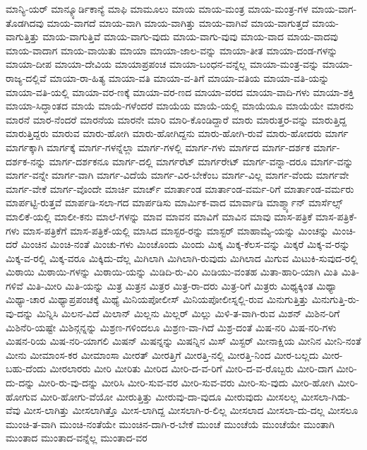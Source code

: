 {ಮಾನ್ಯಿ-ಯರ್
ಮಾನ್ಕ್ಯೂರ್ಡಿಕಾನ್ಯೆ
ಮಾಫಿ
ಮಾಮೂಲು
ಮಾಯ
ಮಾಯ-ಮಂತ್ರ
ಮಾಯ-ಮಂತ್ರ-ಗಳ
ಮಾಯ-ವಾಗ-ತೊಡಗಿದವು
ಮಾಯ-ವಾಗದೆ
ಮಾಯ-ವಾಗಿ
ಮಾಯ-ವಾಗಿತ್ತು
ಮಾಯ-ವಾಗಿವೆ
ಮಾಯ-ವಾಗುತ್ತದೆ
ಮಾಯ-ವಾಗುತ್ತಿತ್ತು
ಮಾಯ-ವಾಗುತ್ತಿವೆ
ಮಾಯ-ವಾಗು-ವುದು
ಮಾಯ-ವಾಗು-ವುವು
ಮಾಯ-ವಾದ
ಮಾಯ-ವಾದವು
ಮಾಯ-ವಾದಾಗ
ಮಾಯ-ವಾಯಿತು
ಮಾಯಾ
ಮಾಯಾ-ಜಾಲ-ವನ್ನು
ಮಾಯಾ-ತೀತ
ಮಾಯಾ-ದಂಡ-ಗಳನ್ನು
ಮಾಯಾ-ದೀಪ
ಮಾಯಾ-ದೇವಿಯ
ಮಾಯಾಪ್ರಪಂಚ
ಮಾಯಾ-ಬಂಧನ-ವನ್ನೆಲ್ಲ
ಮಾಯಾ-ಮಂತ್ರ-ವನ್ನು
ಮಾಯಾ-ರಾಜ್ಯ-ದಲ್ಲಿವೆ
ಮಾಯಾ-ರಾ-ಹಿತ್ಯ
ಮಾಯಾ-ವತಿ
ಮಾಯಾ-ವ-ತಿಗೆ
ಮಾಯಾ-ವತಿಯ
ಮಾಯಾ-ವತಿ-ಯನ್ನು
ಮಾಯಾ-ವತಿ-ಯಲ್ಲಿ
ಮಾಯಾ-ವರ-ಣಕ್ಕೆ
ಮಾಯಾ-ವರ-ಣದ
ಮಾಯಾ-ವರದ
ಮಾಯಾ-ವಾದಿ-ಗಳು
ಮಾಯಾ-ಶಕ್ತಿ
ಮಾಯಾ-ಸಿದ್ಧಾಂತದ
ಮಾಯೆ
ಮಾಯೆ-ಗಳೆಂದರೆ
ಮಾಯೆಯ
ಮಾಯೆ-ಯಲ್ಲಿ
ಮಾಯೆಯೂ
ಮಾಯೆಯೇ
ಮಾರನು
ಮಾರನೆ
ಮಾರ-ನೆಂದರೆ
ಮಾರನೆಯ
ಮಾರನೇ
ಮಾರಿ
ಮಾರಿ-ಕೊಂಡಿದ್ದಾರೆ
ಮಾರು
ಮಾರುತ್ತರ-ವನ್ನು
ಮಾರುತ್ತಿದ್ದ
ಮಾರುತ್ತಿದ್ದರು
ಮಾರುವ
ಮಾರು-ಹೋಗಿ
ಮಾರು-ಹೋಗಿದ್ದನು
ಮಾರು-ಹೋಗಿ-ರುವೆ
ಮಾರು-ಹೋದರು
ಮಾರ್ಗ
ಮಾರ್ಗಕ್ಕಾಗಿ
ಮಾರ್ಗಕ್ಕೆ
ಮಾರ್ಗ-ಗಳನ್ನೆಲ್ಲಾ
ಮಾರ್ಗ-ಗಳಲ್ಲಿ
ಮಾರ್ಗ-ಗಳು
ಮಾರ್ಗದ
ಮಾರ್ಗ-ದರ್ಶಕ
ಮಾರ್ಗ-ದರ್ಶಕ-ನನ್ನು
ಮಾರ್ಗ-ದರ್ಶಕನೂ
ಮಾರ್ಗ-ದಲ್ಲಿ
ಮಾರ್ಗರೆಟ್
ಮಾರ್ಗರೇಟ್
ಮಾರ್ಗ-ವನ್ನಾ-ದರೂ
ಮಾರ್ಗ-ವನ್ನು
ಮಾರ್ಗ-ವನ್ನೇ
ಮಾರ್ಗ-ವಾಗಿ
ಮಾರ್ಗ-ವಿದೆಯೆ
ಮಾರ್ಗ-ವಿರ-ಬೇಕೆಂಬ
ಮಾರ್ಗ-ವಿಲ್ಲ
ಮಾರ್ಗ-ವೆಂದು
ಮಾರ್ಗವೇ
ಮಾರ್ಗ-ವೇಕೆ
ಮಾರ್ಗ-ವೊಂದೇ
ಮಾರ್ಚಿ
ಮಾರ್ಚ್
ಮಾರ್ತಾಂಡ
ಮಾರ್ತಾಂಡ-ವರ್ಮ-ರಿಗೆ
ಮಾರ್ತಾಂಡ-ವರ್ಮರು
ಮಾರ್ಪಟ್ಟಿ-ರುತ್ತವೆ
ಮಾರ್ಪಡಿ-ಸಲಾ-ಗದ
ಮಾರ್ಪಡಿಸು
ಮಾರ್ಮಿಕ-ವಾದ
ಮಾರ್ವಾಡಿ
ಮಾರ್ಶ್ಮ್ಯಾನ್
ಮಾರ್ಸೆಲ್ಸ್
ಮಾಲಿಕೆ-ಯಲ್ಲಿ
ಮಾಲೀ-ಕನು
ಮಾಲೆ-ಗಳನ್ನು
ಮಾವ
ಮಾವನ
ಮಾವಿಗೆ
ಮಾವಿನ
ಮಾವು
ಮಾಸ-ಪತ್ರಿಕೆ
ಮಾಸ-ಪತ್ರಿಕೆ-ಗಳು
ಮಾಸ-ಪತ್ರಿಕೆಗೆ
ಮಾಸ-ಪತ್ರಿಕೆ-ಯಲ್ಲಿ
ಮಾಸಿದ
ಮಾಸ್ಟರ-ರನ್ನು
ಮಾಸ್ಟರ್
ಮಾಹಾಮ್ಯೆ-ಯನ್ನು
ಮಿಂಚನ್ನು
ಮಿಂಚಿ-ದರೆ
ಮಿಂಚಿನ
ಮಿಂಚಿ-ನಂತೆ
ಮಿಂಚು-ಗಳು
ಮಿಂಚೊಂದು
ಮಿಂದು
ಮಿಕ್ಕ
ಮಿಕ್ಕ-ಕೆಲಸ-ವನ್ನು
ಮಿಕ್ಕರೆ
ಮಿಕ್ಕ-ವ-ರನ್ನು
ಮಿಕ್ಕ-ವ-ರಲ್ಲಿ
ಮಿಕ್ಕ-ವರೂ
ಮಿಕ್ಕಿದು-ದೆಲ್ಲ
ಮಿಗಿಲಾಗಿ
ಮಿಗಿಲಾಗಿ-ರುವುದು
ಮಿಗಿಲಾದ
ಮಿಗುವ
ಮಿಟುಕಿ-ಸುವುದ-ರಲ್ಲಿ
ಮಿಠಾಯಿ
ಮಿಠಾಯಿ-ಗಳನ್ನು
ಮಿಠಾಯಿ-ಯನ್ನು
ಮಿಡಿದಿ-ರು-ವಿರಿ
ಮಿಡಿಯು-ವಂತಹ
ಮಿತಾ-ಹಾರಿ-ಯಾಗಿ
ಮಿತಿ
ಮಿತಿ-ಗಳಿವೆ
ಮಿತಿ-ಮೀರಿ
ಮಿತಿ-ಯನ್ನು
ಮಿತ್ರ
ಮಿತ್ರನ
ಮಿತ್ರರ
ಮಿತ್ರ-ರಾ-ದರು
ಮಿತ್ರ-ರಿಗೆ
ಮಿತ್ರರು
ಮಿಥ್ಯಕ್ಕಿಂತ
ಮಿಥ್ಯಾ
ಮಿಥ್ಯಾ-ಚಾರ
ಮಿಥ್ಯಾಪ್ರಪಂಚಕ್ಕೆ
ಮಿಥ್ಯೆ
ಮಿನಿಯಪೋಲೀಸ್
ಮಿನಿಯಪೋಲೀಸ್ನಲ್ಲಿ-ರುವ
ಮಿನುಗುತ್ತಿತ್ತು
ಮಿನುಗುತ್ತಿ-ರು-ವು-ದನ್ನು
ಮಿನ್ನಿಸಿ
ಮಿಲನ-ವಿದೆ
ಮಿಲಾನ್
ಮಿಲ್ಲನು
ಮಿಲ್ಲರ್
ಮಿಲ್ಲು
ಮಿಳಿ-ತ-ವಾಗಿ-ರುವ
ಮಿಶನ್
ಮಿಶಿನ-ರಿಗೆ
ಮಿಶಿನೆರಿ-ಯಷ್ಟೇ
ಮಿಶಿನ್ಗನ್ನನ್ನು
ಮಿಶ್ರಣ-ಗಳಿಂದಲೂ
ಮಿಶ್ರಣ-ವಾ-ಗಿದೆ
ಮಿಶ್ರ-ದಂತೆ
ಮಿಷ-ನರಿ
ಮಿಷ-ನರಿ-ಗಳು
ಮಿಷನ-ರಿಯ
ಮಿಷ-ನರಿ-ಯಾಗಲಿ
ಮಿಷನ್
ಮಿಷನ್ನನ್ನು
ಮಿಷನ್ನಿನ
ಮಿಸ್
ಮಿಸ್ಟರ್
ಮೀನಾಕ್ಷಿಯ
ಮೀನಿನ
ಮೀನಿ-ನಂತೆ
ಮೀನು
ಮೀಮಾಂಸ-ಕರ
ಮೀಮಾಂಸಾ
ಮೀರತ್
ಮೀರತ್ತಿಗೆ
ಮೀರತ್ತಿ-ನಲ್ಲಿ
ಮೀರತ್ತಿ-ನಿಂದ
ಮೀರ-ಬಲ್ಲದು
ಮೀರ-ಬಹು-ದೆಂದು
ಮೀರಲಾರರು
ಮೀರಿ
ಮೀರಿತು
ಮೀರಿದ
ಮೀರಿ-ದ-ವ-ರಿಗೆ
ಮೀರಿ-ದ-ವ-ರೊಬ್ಬರು
ಮೀರಿ-ದಾಗ
ಮೀರಿ-ದು-ದನ್ನು
ಮೀರಿ-ರು-ವು-ದನ್ನು
ಮೀರಿಸಿ
ಮೀರಿ-ಸುವ-ವರ
ಮೀರಿ-ಸುವ-ವರು
ಮೀರಿ-ಸು-ವುದು
ಮೀರಿ-ಹೋಗಿ
ಮೀರಿ-ಹೋಗುವ
ಮೀರಿ-ಹೋಗು-ವೆಯೋ
ಮೀರುತ್ತಿತ್ತು
ಮೀರುವು-ದಾ-ವುದೂ
ಮೀರುವುದು
ಮೀಸಲಲ್ಲ
ಮೀಸಲಾ-ಗಿಡು-ವೆವು
ಮೀಸ-ಲಾಗಿತ್ತು
ಮೀಸಲಾಗಿತ್ತೊ
ಮೀಸ-ಲಾಗಿದ್ದ
ಮೀಸಲಾಗಿ-ರ-ಲಿಲ್ಲ
ಮೀಸಲಾದ
ಮೀಸಲಾ-ದು-ದಲ್ಲ
ಮೀಸಲೂ
ಮುಂಚಿ-ತ-ವಾಗಿ
ಮುಂಚಿ-ನಂತೆಯೇ
ಮುಂಚಿನ-ದಾಗಿ-ರ-ಬೇಕೆ
ಮುಂಚೆ
ಮುಂಚೆಯೆ
ಮುಂಚೆಯೇ
ಮುಂತಾಗಿ
ಮುಂತಾದ
ಮುಂತಾದ-ವನ್ನೆಲ್ಲ
ಮುಂತಾದ-ವರ
}
